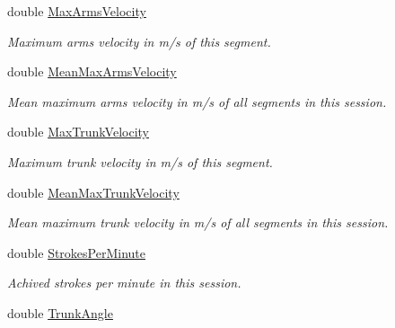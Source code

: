 \begin{DoxyCompactItemize}
double \hyperlink{struct_rowing_monitor_1_1_model_1_1_util_1_1_rowing_meta_data_a7143799bca95bc54ea1089ba941c8df4}{Max\+Arms\+Velocity}
\begin{DoxyCompactList}\small\item\em Maximum arms velocity in m/s of this segment. \end{DoxyCompactList}\item 
double \hyperlink{struct_rowing_monitor_1_1_model_1_1_util_1_1_rowing_meta_data_a57df10beaf4d3ecc43d25e1ecb669e51}{Mean\+Max\+Arms\+Velocity}
\begin{DoxyCompactList}\small\item\em Mean maximum arms velocity in m/s of all segments in this session. \end{DoxyCompactList}\item 
double \hyperlink{struct_rowing_monitor_1_1_model_1_1_util_1_1_rowing_meta_data_abdfd0d10608e2655f12994cda812b060}{Max\+Trunk\+Velocity}
\begin{DoxyCompactList}\small\item\em Maximum trunk velocity in m/s of this segment. \end{DoxyCompactList}\item 
double \hyperlink{struct_rowing_monitor_1_1_model_1_1_util_1_1_rowing_meta_data_a191473e54dbd2ae98eac311b16b51067}{Mean\+Max\+Trunk\+Velocity}
\begin{DoxyCompactList}\small\item\em Mean maximum trunk velocity in m/s of all segments in this session. \end{DoxyCompactList}\item 
double \hyperlink{struct_rowing_monitor_1_1_model_1_1_util_1_1_rowing_meta_data_a902fe8ed57c2f5456ebe952c15e22a41}{Strokes\+Per\+Minute}
\begin{DoxyCompactList}\small\item\em Achived strokes per minute in this session. \end{DoxyCompactList}\item 
double \hyperlink{struct_rowing_monitor_1_1_model_1_1_util_1_1_rowing_meta_data_af5d1c9f60b7d822db1aa9054e7a9e8ff}{Trunk\+Angle}

\end{DoxyCompactItemize}
